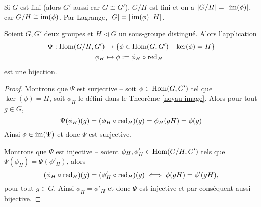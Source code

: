 \begin{cor}
	Si $G$ est fini (alors $G'$ aussi car $G \cong G'$), $G/H$ est fini et on a
	$|G/H| = |\operatorname{im}(\phi)|$, car $G/H \cong \operatorname{im}(\phi)$.
	Par Lagrange, $|G| = |\operatorname{im}(\phi)||H|$.
\end{cor}


\begin{thm}
	\label{prop-quotient}
	Soient $G, G'$ deux groupes et $H \triangleleft G$ un sous-groupe distingué.
	Alors l'application
	\begin{align*}
		\Psi : \Hom(G/H, G') &\to \{\phi \in \Hom(G, G')\ |\ \ker(\phi) = H\}\\
		\phi_H &\mapsto \phi := \phi_H \circ \red_H
	\end{align*}
	est une bijection.
\end{thm}

\begin{proof}
	Montrons que $\Psi$ est surjective -- soit $\phi \in \operatorname{Hom}(G, G')$
	tel que $\ker(\phi) = H$, soit $\phi_H$ le défini dans le Theorème \ref{noyau-image}. 
	Alors pour tout $g \in G$,
	\begin{equation*}
		\Psi(\phi_H)(g) = (\phi_H \circ \operatorname{red}_H) (g) = \phi_H(gH) = \phi(g)
	\end{equation*}
	Ainsi $\phi \in \operatorname{im}(\Psi)$ et donc $\Psi$ est surjective.  

	Montrons que $\Psi$ est injective -- soient $\phi_H, \phi'_H \in \operatorname{Hom}(G/H, G')$
	tels que $\Psi(\phi_H) = \Psi(\phi'_H)$, alors
	\begin{equation*}
		(\phi_H \circ \operatorname{red}_H)(g) = (\phi'_H \circ \operatorname{red}_H)(g)	
		\iff \phi(gH) = \phi'(gH),
	\end{equation*}
	pour tout $g \in G$. Ainsi $\phi_H = \phi'_H$ et donc $\Psi$ est injective
	et par conséquent aussi bijective.
\end{proof}


